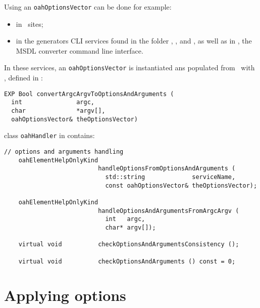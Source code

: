 Using an {\tt oahOptionsVector} can be done for example:
\begin{itemize}
\item in \Web\ sites; %
\item in the generators CLI services found in the \clisamples{} folder , ,  and , as well as in , the MSDL converter command line interface.
\end{itemize}

 In these services, an {\tt oahOptionsVector} is instantiated ans populated from \argcargv\ with , defined in :%
\begin{lstlisting}[language=CPlusPlus]
EXP Bool convertArgcArgvToOptionsAndArguments (
  int               argc,
  char              *argv[],
  oahOptionsVector& theOptionsVector)
\end{lstlisting}

class   {\tt oahHandler} in  contains:
\begin{lstlisting}[language=CPlusPlus]
    // options and arguments handling
    oahElementHelpOnlyKind
                          handleOptionsFromOptionsAndArguments (
                            std::string             serviceName,
                            const oahOptionsVector& theOptionsVector);

    oahElementHelpOnlyKind
                          handleOptionsAndArgumentsFromArgcArgv (
                            int   argc,
                            char* argv[]);

    virtual void          checkOptionsAndArgumentsConsistency ();

    virtual void          checkOptionsAndArguments () const = 0;
\end{lstlisting}


\section{Applying options}

